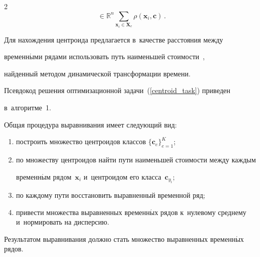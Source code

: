\begin{multicols}{2}
\begin{equation}
{{    \in \mathbb{R}^n}}\sum\limits_{\mathbf{x}_i \in \mathbf{X}_e}


    {\rho(\mathbf{x}_i ,\mathbf{c})}\,.


\end{equation}





Для нахождения центроида предлагается в~качестве расстояния между 


временн$\acute{\mbox{ы}}$ми рядами использовать путь наименьшей стоимости~\cite{goncharov2015cost}, 


найден\-ный методом динамической трансформации времени.


Псевдокод решения оптимизационной задачи~(\ref{centroid_task}) приведен 


в~алгоритме~1.











Общая процедура выравнивания имеет сле\-ду\-ющий вид:


\begin{enumerate}[(1)]


    \item


    построить множество центроидов классов $\{\mathbf{c}_e\}_{e = 1}^K$;


    \item


    по множеству центроидов найти пути наименьшей стоимости между каждым


    временн$\acute{\mbox{ы}}$м рядом~$\mathbf{x}_i$ и~центроидом его класса~$\mathbf{c}_{y_i}$;


    \item


    по каждому пути восстановить выравненный временной ряд;


    \item


        привести множества выравненных временн$\acute{\mbox{ы}}$х рядов к~нулевому среднему и~нормировать на дисперсию.


\end{enumerate}





Результатом выравнивания должно стать множество выравненных временн$\acute{\mbox{ы}}$х рядов.






\end{multicols}
